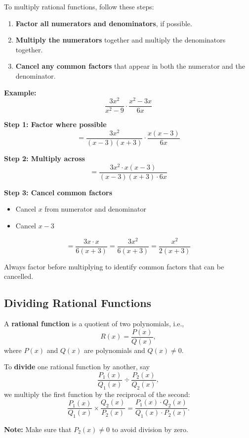 \documentclass[11pt]{article}
\begin{document}
To multiply rational functions, follow these steps:

\begin{enumerate}
  \item \textbf{Factor all numerators and denominators}, if possible.
  \item \textbf{Multiply the numerators} together and multiply the denominators together.
  \item \textbf{Cancel any common factors} that appear in both the numerator and the denominator.
\end{enumerate}

\textbf{Example:}
\[
\frac{3x^2}{x^2 - 9} \cdot \frac{x^2 - 3x}{6x}
\]

\textbf{Step 1: Factor where possible}
\[
= \frac{3x^2}{(x - 3)(x + 3)} \cdot \frac{x(x - 3)}{6x}
\]

\textbf{Step 2: Multiply across}
\[
= \frac{3x^2 \cdot x(x - 3)}{(x - 3)(x + 3) \cdot 6x}
\]

\textbf{Step 3: Cancel common factors}
\begin{itemize}
  \item Cancel \( x \) from numerator and denominator
  \item Cancel \( x - 3 \)
\end{itemize}
\[
= \frac{3x \cdot x}{6(x + 3)} = \frac{3x^2}{6(x + 3)} = \frac{x^2}{2(x + 3)}
\]

\begin{tcolorbox}[colback=blue!5!white, colframe=blue!80!black, title=Key Tip]
Always factor before multiplying to identify common factors that can be cancelled.
\end{tcolorbox}


\subsection{Dividing Rational Functions}

A \textbf{rational function} is a quotient of two polynomials, i.e.,
\[
R(x) = \frac{P(x)}{Q(x)},
\]
where \(P(x)\) and \(Q(x)\) are polynomials and \(Q(x) \neq 0\).

To \textbf{divide} one rational function by another, say
\[
\frac{P_1(x)}{Q_1(x)} \div \frac{P_2(x)}{Q_2(x)},
\]
we multiply the first function by the reciprocal of the second:
\[
\frac{P_1(x)}{Q_1(x)} \times \frac{Q_2(x)}{P_2(x)} = \frac{P_1(x) \cdot Q_2(x)}{Q_1(x) \cdot P_2(x)}.
\]

\textbf{Note:} Make sure that \(P_2(x) \neq 0\) to avoid division by zero.
\end{document}

